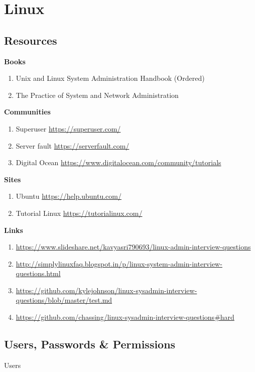 \documentclass{notes}
\begin{document}
\tableofcontents
\chapter{Linux}
\section{Resources}
	\textbf{Books}
		\begin{enumerate}
			\item Unix and Linux System Administration Handbook (Ordered)
			\item The Practice of System and Network Administration
		\end{enumerate}
	\textbf{Communities}
		\begin{enumerate}
			\item Superuser \ra \url{https://superuser.com/}
			\item Server fault \ra \url{https://serverfault.com/}
			\item Digital Ocean \ra \url{https://www.digitalocean.com/community/tutorials}
		\end{enumerate}
	\textbf{Sites}
		\begin{enumerate}
			\item Ubuntu \ra \url{https://help.ubuntu.com/}
			\item Tutorial Linux \ra \url{https://tutorialinux.com/}
		\end{enumerate}
	\textbf{Links}
		\begin{enumerate}
			\item \url{https://www.slideshare.net/kavyasri790693/linux-admin-interview-questions}
			\item \url{http://simplylinuxfaq.blogspot.in/p/linux-system-admin-interview-questions.html}
			\item \url{https://github.com/kylejohnson/linux-sysadmin-interview-questions/blob/master/test.md}
			\item \url{https://github.com/chassing/linux-sysadmin-interview-questions#hard}
		\end{enumerate}

\section{Users, Passwords \& Permissions}
\begin{questions}{Users}
	\begin{questionAnswer}
	\end{questionAnswer}
\end{questions}
\end{document}
